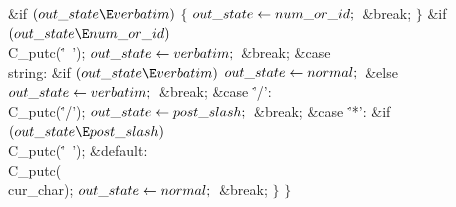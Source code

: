 \&{if} ${}(\\{out\_state}\E\\{verbatim}){}$\5
${}\{{}$\1\6
${}\\{out\_state}\leftarrow\\{num\_or\_id};{}$\6
\&{break};\6
\4${}\}{}$\2\6
\&{if} ${}(\\{out\_state}\E\\{num\_or\_id}){}$\1\5
\\{C\_putc}(\.{'\ '});\2\6
${}\\{out\_state}\leftarrow\\{verbatim};{}$\6
\&{break};\6
\4\&{case} \\{string}:\6
\&{if} ${}(\\{out\_state}\E\\{verbatim}){}$\1\5
${}\\{out\_state}\leftarrow\\{normal};{}$\2\6
\&{else}\1\5
${}\\{out\_state}\leftarrow\\{verbatim};{}$\2\6
\&{break};\6
\4\&{case} \.{'/'}:\5
\\{C\_putc}(\.{'/'});\6
${}\\{out\_state}\leftarrow\\{post\_slash};{}$\6
\&{break};\6
\4\&{case} \.{'*'}:\6
\&{if} ${}(\\{out\_state}\E\\{post\_slash}){}$\1\5
\\{C\_putc}(\.{'\ '});\2\6
\6
\4\&{default}:\5
\\{C\_putc}(\\{cur\_char});\6
${}\\{out\_state}\leftarrow\\{normal};{}$\6
\&{break};\6
\4${}\}{}$\2\6
\4${}\}{}$\2\par
\fi

